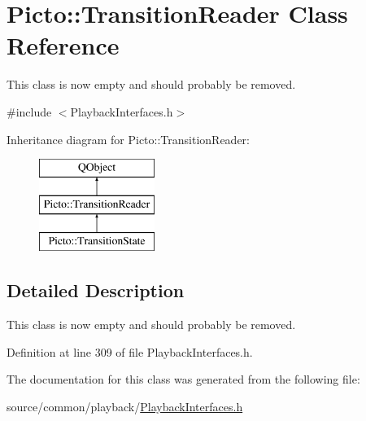 \hypertarget{class_picto_1_1_transition_reader}{\section{Picto\-:\-:Transition\-Reader Class Reference}
\label{class_picto_1_1_transition_reader}
}


This class is now empty and should probably be removed.  




{\ttfamily \#include $<$Playback\-Interfaces.\-h$>$}

Inheritance diagram for Picto\-:\-:Transition\-Reader\-:\begin{figure}[H]
\begin{center}
\leavevmode
\includegraphics[height=3.000000cm]{class_picto_1_1_transition_reader}
\end{center}
\end{figure}


\subsection{Detailed Description}
This class is now empty and should probably be removed. 

Definition at line 309 of file Playback\-Interfaces.\-h.



The documentation for this class was generated from the following file\-:\begin{DoxyCompactItemize}
\item 
source/common/playback/\hyperlink{_playback_interfaces_8h}{Playback\-Interfaces.\-h}\end{DoxyCompactItemize}
